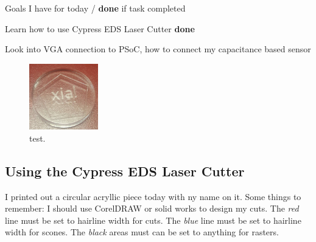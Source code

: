 \documentclass[12pt,twoside]{article}
\newenvironment{tight_itemize}{
\begin{itemize}
  \setlength{\itemsep}{0pt}
  \setlength{\parskip}{0pt}
}{\end{itemize}}
\begin{document}
Goals I have for today / {\bf done} if task completed
\begin{tight_itemize}
\item Learn how to use Cypress EDS Laser Cutter  {\bf done}
\item Look into VGA connection to PSoC, how to connect my capacitance based sensor
\end{tight_itemize}
\begin{figure}
\centering
\includegraphics[width = 30mm]{Pics/4-24b.jpg} 
\caption{\label{fig:frog1}test.} 
\end{figure}
\subsection{Using the Cypress EDS Laser Cutter}
I printed out a circular acryllic piece today with ny name on it. Some things to remember: I should use CorelDRAW or solid works to design my cuts. The {\em red} line must be set to hairline width for cuts. The {\em blue} line must be set to hairline width for scones. The {\em black} areas must can be set to anything for rasters. 
\end{document}
